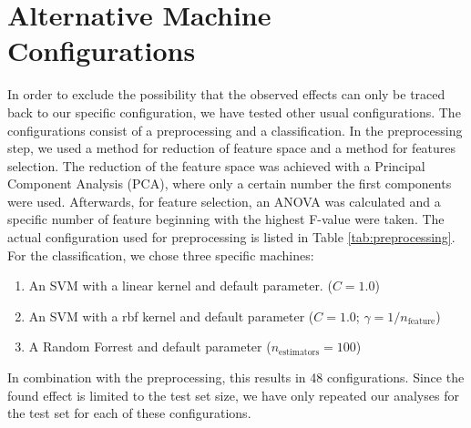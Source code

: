     \section{Alternative Machine Configurations}
    \label{cha:alternative_machine_configurations}
    \setcounter{figure}{0}
\setcounter{table}{0}
    In order to exclude the possibility that the observed effects can only be traced back to our specific configuration, we have tested other usual configurations. The configurations consist of a preprocessing and a classification. In the preprocessing step, we used a method for reduction of feature space and a method for features selection. The reduction of the feature space was achieved with a Principal Component Analysis (PCA), where only a certain number the first components were used. Afterwards, for feature selection, an ANOVA was calculated and a specific number of feature beginning with the highest F-value were taken. The actual configuration used for preprocessing is listed in Table \ref{tab:preprocessing}.
    For the classification, we chose three specific machines:
    \begin{enumerate}
        \item An SVM with a linear kernel and default parameter. ($C = \num{1.0}$)
        \item An SVM with a rbf kernel and default parameter ($C = \num{1.0}$; $\gamma = 1/n_\text{feature}$)
        \item A Random Forrest and default parameter ($n_\text{estimators}=\num{100}$)
    \end{enumerate}

    In combination with the preprocessing, this results in 48 configurations. Since the found effect is limited to the test set size, we have only repeated our analyses for the test set for each of these configurations.

